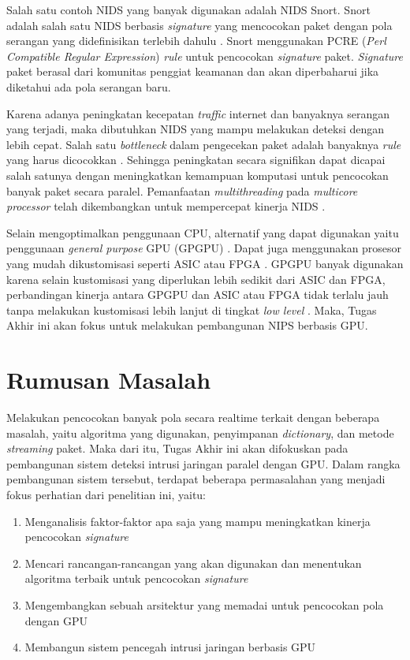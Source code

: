   Salah satu contoh NIDS yang banyak digunakan adalah NIDS Snort. Snort adalah salah satu NIDS berbasis \emph{signature} yang mencocokan paket dengan pola serangan yang didefinisikan terlebih dahulu \parencite{snort}. Snort menggunakan PCRE (\emph{Perl Compatible Regular Expression}) \emph{rule} untuk pencocokan \emph{signature} paket. \emph{Signature} paket berasal dari komunitas penggiat keamanan dan akan diperbaharui jika diketahui ada pola serangan baru.

  Karena adanya peningkatan kecepatan \emph{traffic} internet dan banyaknya serangan yang terjadi, maka dibutuhkan NIDS yang mampu melakukan deteksi dengan lebih cepat. Salah satu \emph{bottleneck} dalam pengecekan paket adalah banyaknya \emph{rule} yang harus dicocokkan \parencite{pcre2007}. Sehingga peningkatan secara signifikan dapat dicapai salah satunya dengan meningkatkan kemampuan komputasi untuk pencocokan banyak paket secara paralel. Pemanfaatan \emph{multithreading} pada \emph{multicore processor} telah dikembangkan untuk mempercepat kinerja NIDS \parencite{multi2004}.

  Selain mengoptimalkan penggunaan CPU, alternatif yang dapat digunakan yaitu penggunaan \emph{general purpose} GPU (GPGPU) \parencite{4482891}. Dapat juga menggunakan prosesor yang mudah dikustomisasi seperti ASIC atau FPGA \parencite{fpga2008}. GPGPU banyak digunakan karena selain kustomisasi yang diperlukan lebih sedikit dari ASIC dan FPGA, perbandingan kinerja antara GPGPU dan ASIC atau FPGA tidak terlalu jauh tanpa melakukan kustomisasi lebih lanjut di tingkat \emph{low level} \parencite{gnort2008}. Maka, Tugas Akhir ini akan fokus untuk melakukan pembangunan NIPS berbasis GPU.

\section{Rumusan Masalah}

  Melakukan pencocokan banyak pola secara realtime terkait dengan beberapa masalah, yaitu algoritma yang digunakan, penyimpanan \emph{dictionary}, dan metode \emph{streaming} paket. Maka dari itu, Tugas Akhir ini akan difokuskan pada pembangunan sistem deteksi intrusi jaringan paralel dengan GPU. Dalam rangka pembangunan sistem tersebut, terdapat beberapa permasalahan yang menjadi fokus perhatian dari penelitian ini, yaitu: \\
  \begin{enumerate}
      \item Menganalisis faktor-faktor apa saja yang mampu meningkatkan kinerja pencocokan \emph{signature}
      \item Mencari rancangan-rancangan yang akan digunakan dan menentukan algoritma terbaik untuk pencocokan \emph{signature}
      \item Mengembangkan sebuah arsitektur yang memadai untuk pencocokan pola dengan GPU
      \item Membangun sistem pencegah intrusi jaringan berbasis GPU
  \end{enumerate}

